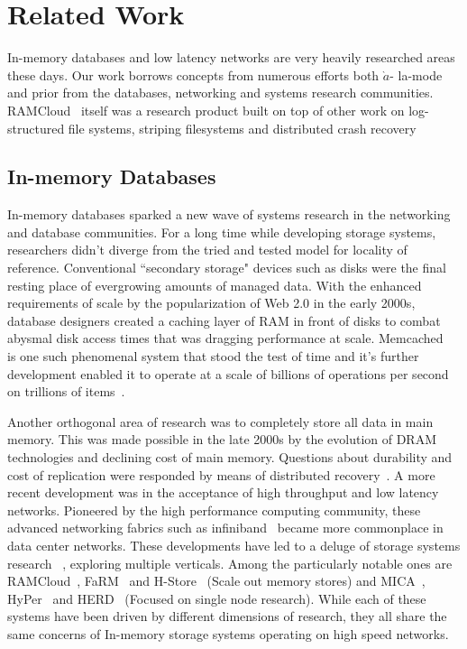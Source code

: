 
\chapter{Related Work}
In-memory databases and low latency networks are very heavily researched areas
these days. Our work borrows concepts from numerous efforts both $\grave{a}$-
la-mode and prior from the databases, networking and systems research communities.
RAMCloud~\cite{ramcloud} itself was a research product built on top of other 
work on log-structured file systems, striping filesystems and distributed 
crash recovery~\cite{ryan-thesis}

\section{In-memory Databases}
In-memory databases sparked a new wave of systems research in the 
networking and database communities. For a long time while developing storage
systems, researchers didn't diverge from the  tried and tested model for
locality of reference. Conventional ``secondary storage" devices
such as disks were the final resting place of evergrowing amounts of managed data. With the 
enhanced requirements of scale by the popularization of Web 2.0 in the early 2000s, 
database designers created a caching layer of RAM in front of disks
to combat abysmal disk access times that was dragging performance at scale. Memcached~\cite{memcached-orig}
is one such phenomenal system that stood the test of time and it's further development
enabled it to operate at a scale of billions of operations per second on trillions of items~\cite{nishtala2013scaling}.

Another orthogonal area of research was to completely store all data in main memory.
This was made possible in the late 2000s by the evolution of DRAM technologies and declining cost of main memory.
Questions about durability and cost of replication 
were responded by means of distributed recovery~\cite{ongaro2011fast}. 
A more recent development was in the acceptance of high throughput and low latency networks. 
Pioneered by the high performance computing community, these advanced networking fabrics 
such as infiniband~\cite{pfister2001introduction} became more commonplace in 
data center networks. These developments have led to a deluge of storage systems research~\cite{mmdbmstutorial} ,
exploring multiple verticals. Among the particularly notable ones are RAMCloud~\cite{ramcloud},
FaRM~\cite{farm} and H-Store~\cite{hstore} (Scale out memory stores) and
MICA~\cite{mica}, HyPer~\cite{hyper} and HERD~\cite{herd} (Focused on single node research).
While each of these systems have been driven by different dimensions 
of research, they all share the same concerns of In-memory storage systems 
operating on high speed networks.

